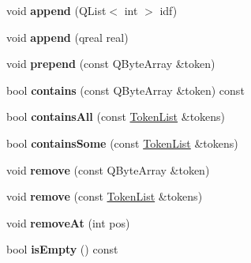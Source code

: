 \begin{DoxyCompactItemize}
\item 
\hypertarget{class_token_list_ad9945f8e415f13ca1722e478a2bce70c}{void {\bfseries append} (Q\-List$<$ int $>$ idf)}\label{class_token_list_ad9945f8e415f13ca1722e478a2bce70c}

\item 
\hypertarget{class_token_list_a1b60a8e128aa3a56318b9dc63ba1cb10}{void {\bfseries append} (qreal real)}\label{class_token_list_a1b60a8e128aa3a56318b9dc63ba1cb10}

\item 
\hypertarget{class_token_list_aad26916d5d1a43998b3b945467936b68}{void {\bfseries prepend} (const Q\-Byte\-Array \&token)}\label{class_token_list_aad26916d5d1a43998b3b945467936b68}

\item 
\hypertarget{class_token_list_a844b3b0bda8817ba06a0c49dcca109ec}{bool {\bfseries contains} (const Q\-Byte\-Array \&token) const }\label{class_token_list_a844b3b0bda8817ba06a0c49dcca109ec}

\item 
\hypertarget{class_token_list_ad062daaa8e4aca82de7f64c3596e4027}{bool {\bfseries contains\-All} (const \hyperlink{class_token_list}{Token\-List} \&tokens)}\label{class_token_list_ad062daaa8e4aca82de7f64c3596e4027}

\item 
\hypertarget{class_token_list_acc49fbe6dd0f654349592f753c42164b}{bool {\bfseries contains\-Some} (const \hyperlink{class_token_list}{Token\-List} \&tokens)}\label{class_token_list_acc49fbe6dd0f654349592f753c42164b}

\item 
\hypertarget{class_token_list_ade7470e4caa33682b3921442a9fe54e7}{void {\bfseries remove} (const Q\-Byte\-Array \&token)}\label{class_token_list_ade7470e4caa33682b3921442a9fe54e7}

\item 
\hypertarget{class_token_list_ac8870e62996acd59b76a4c86857968f3}{void {\bfseries remove} (const \hyperlink{class_token_list}{Token\-List} \&tokens)}\label{class_token_list_ac8870e62996acd59b76a4c86857968f3}

\item 
\hypertarget{class_token_list_ae847470c331cdb0e329f17db78c905b5}{void {\bfseries remove\-At} (int pos)}\label{class_token_list_ae847470c331cdb0e329f17db78c905b5}

\item 
\hypertarget{class_token_list_ad626ad939c495037c644de06dd5b79d3}{bool {\bfseries is\-Empty} () const }\label{class_token_list_ad626ad939c495037c644de06dd5b79d3}


\end{DoxyCompactItemize}
